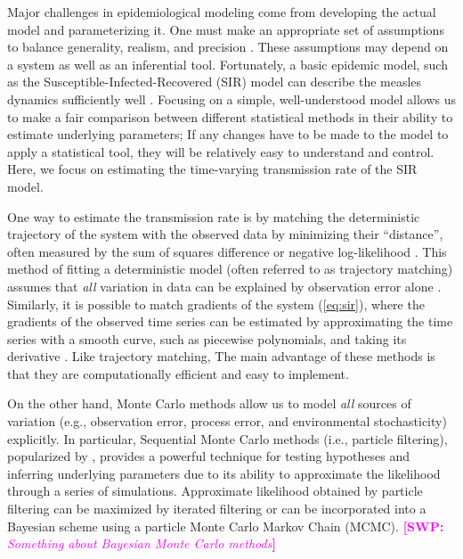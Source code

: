 \documentclass{article}
\newcommand{\eref}[1]{(\ref{eq:#1})}
\newcommand{\comment}[3]{\textcolor{#1}{\textbf{[#2: }\textsl{#3}\textbf{]}}}
\newcommand{\swp}[1]{\comment{magenta}{SWP}{#1}}
\begin{document}
Major challenges in epidemiological modeling come from developing the actual model and parameterizing it.
One must make an appropriate set of assumptions to balance generality, realism, and precision \citep{levins1966strategy}.
These assumptions may depend on a system as well as an inferential tool.
Fortunately, a basic epidemic model, such as the Susceptible-Infected-Recovered (SIR) model can describe the measles dynamics sufficiently well \citep{earn2000simple, krylova2013effects, hempel2015century, dalziel2016persistent}.
Focusing on a simple, well-understood model allows us to make a fair comparison between different statistical methods in their ability to estimate underlying parameters;
If any changes have to be made to the model to apply a statistical tool, they will be relatively easy to understand and control.
Here, we focus on estimating the time-varying transmission rate of the SIR model.

One way to estimate the transmission rate is by matching the deterministic trajectory of the system with the observed data by minimizing their ``distance'', often measured by the sum of squares difference or negative log-likelihood \citep{riley2003transmission, chowell2004basic}.
This method of fitting a deterministic model (often referred to as trajectory matching) assumes that \emph{all} variation in data can be explained by observation error alone \citep{bolker2008ecological}.
Similarly, it is possible to match gradients of the system \eref{sir}, where the gradients of the observed time series can be estimated by approximating the time series with a smooth curve, such as piecewise polynomials, and taking its derivative \citep{ellner2002fitting}.
Like trajectory matching, 
The main advantage of these methods is that they are computationally efficient and easy to implement.

On the other hand, Monte Carlo methods allow us to model \emph{all} sources of variation (e.g., observation error, process error, and environmental stochasticity) explicitly.
In particular, Sequential Monte Carlo methods (i.e., particle filtering), popularized by \cite{king2015statistical}, provides a powerful technique for testing hypotheses and inferring underlying parameters due to its ability to approximate the likelihood through a series of simulations.
Approximate likelihood obtained by particle filtering can be maximized by iterated filtering \citep{ionides2011iterated, ionides2015inference} or can be incorporated into a Bayesian scheme using a particle Monte Carlo Markov Chain (MCMC).
\swp{Something about Bayesian Monte Carlo methods}
\end{document}

